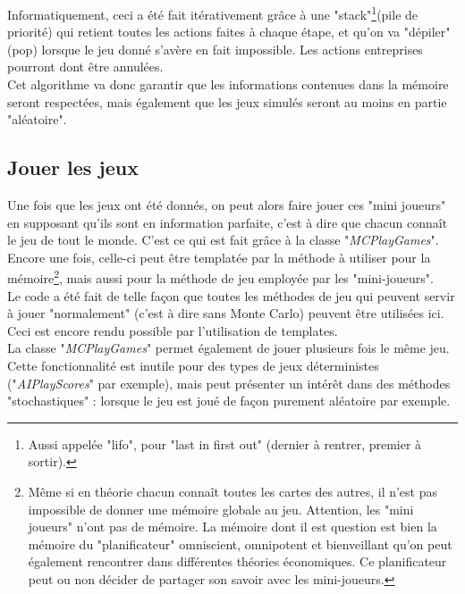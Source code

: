 \documentclass[a4paper,11pt]{article}
\begin{document}
Informatiquement, ceci a été fait itérativement grâce à une "stack"\footnote{Aussi appelée "lifo", pour "last in first out" (dernier à rentrer, premier à sortir).}(pile de priorité) qui retient toutes les actions faites à chaque étape, et qu'on va "dépiler" (pop) lorsque le jeu donné s'avère en fait impossible. Les actions entreprises pourront dont être annulées. \\

Cet algorithme va donc garantir que les informations contenues dans la mémoire seront respectées, mais également que les jeux simulés seront au moins en partie "aléatoire".

\subsection{Jouer les jeux}
Une fois que les jeux ont été donnés, on peut alors faire jouer ces "mini joueurs" en supposant qu'ils sont en information parfaite, c'est à dire que chacun connaît le jeu de tout le monde. C'est ce qui est fait grâce à la classe "\textit{MCPlayGames}". \\

Encore une fois, celle-ci peut être templatée par la méthode à utiliser pour la mémoire\footnote{Même si en théorie chacun connaît toutes les cartes des autres, il n'est pas impossible de donner une mémoire globale au jeu. Attention, les "mini joueurs" n'ont pas de mémoire. La mémoire dont il est question est bien la mémoire du "planificateur" omniscient, omnipotent et bienveillant qu'on peut également rencontrer dans différentes théories économiques. Ce planificateur peut ou non décider de partager son savoir avec les mini-joueurs.}, mais aussi pour la méthode de jeu employée par les "mini-joueurs". \\

Le code a été fait de telle façon que toutes les méthodes de jeu qui peuvent servir à jouer "normalement" (c'est à dire sans Monte Carlo) peuvent être utilisées ici. Ceci est encore rendu possible par l'utilisation de templates. \\

La classe "\textit{MCPlayGames}" permet également de jouer plusieurs fois le même jeu. Cette fonctionnalité est inutile pour des types de jeux déterministes ("\textit{AIPlayScores}" par exemple), mais peut présenter un intérêt dans des méthodes "stochastiques" : lorsque le jeu est joué de façon purement aléatoire par exemple. \\
\end{document}
